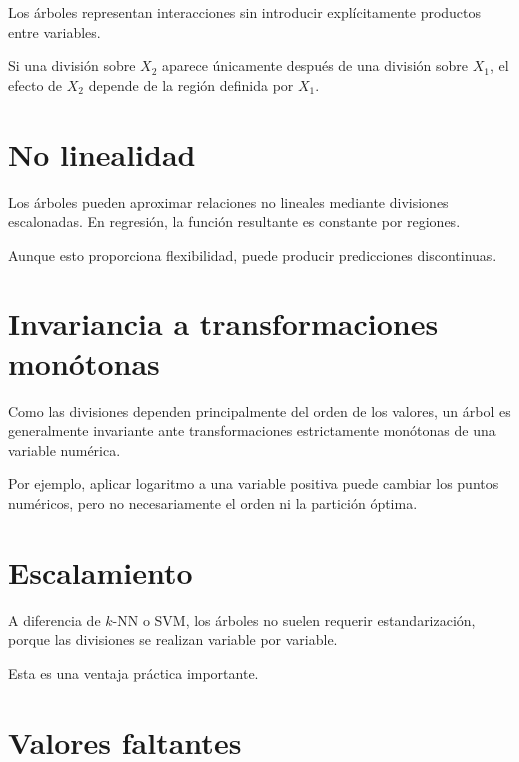 \documentclass[
  spanish,
  10.5pt,
  letterpaper,
  DIV=11,
  numbers=noendperiod,
  oneside,
  open=any]{scrreprt}
\theoremstyle{definition}
\theoremstyle{definition}
\theoremstyle{plain}
\theoremstyle{remark}
\begin{document}
Los árboles representan interacciones sin introducir explícitamente
productos entre variables.

Si una división sobre \(X_2\) aparece únicamente después de una división
sobre \(X_1\), el efecto de \(X_2\) depende de la región definida por
\(X_1\).

\section*{No linealidad}\label{no-linealidad}


Los árboles pueden aproximar relaciones no lineales mediante divisiones
escalonadas. En regresión, la función resultante es constante por
regiones.

Aunque esto proporciona flexibilidad, puede producir predicciones
discontinuas.

\section*{Invariancia a transformaciones
monótonas}\label{invariancia-a-transformaciones-monuxf3tonas}


Como las divisiones dependen principalmente del orden de los valores, un
árbol es generalmente invariante ante transformaciones estrictamente
monótonas de una variable numérica.

Por ejemplo, aplicar logaritmo a una variable positiva puede cambiar los
puntos numéricos, pero no necesariamente el orden ni la partición
óptima.

\section*{Escalamiento}\label{escalamiento}


A diferencia de \(k\)-NN o SVM, los árboles no suelen requerir
estandarización, porque las divisiones se realizan variable por
variable.

Esta es una ventaja práctica importante.

\section*{Valores faltantes}\label{valores-faltantes}
\end{document}
